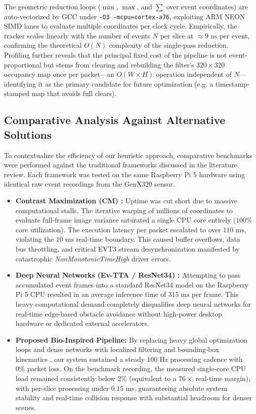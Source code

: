 \documentclass[conference]{IEEEtran}
\begin{document}
The geometric reduction loops ($\min$, $\max$, and $\sum$ over event coordinates) are auto-vectorized by GCC under \texttt{-O3 -mcpu=cortex-a76}, exploiting ARM NEON SIMD lanes to evaluate multiple coordinates per clock cycle. Empirically, the tracker scales linearly with the number of events $N$ per slice at $\approx 9\text{ ns}$ per event, confirming the theoretical $O(N)$ complexity of the single-pass reduction. Profiling further reveals that the principal fixed cost of the pipeline is not event-proportional but stems from clearing and rebuilding the filter's $320 \times 320$ occupancy map once per packet---an $O(W \times H)$ operation independent of $N$---identifying it as the primary candidate for future optimization (e.g. a timestamp-stamped map that avoids full clears).

\subsection{Comparative Analysis Against Alternative Solutions}
To contextualize the efficiency of our heuristic approach, comparative benchmarks were performed against the traditional frameworks discussed in the literature review. Each framework was tested on the same Raspberry Pi 5 hardware using identical raw event recordings from the GenX320 sensor.

\begin{itemize}
    \item \textbf{Contrast Maximization (CM) \cite{b6}:} Uptime was cut short due to massive computational stalls. The iterative warping of millions of coordinates to evaluate full-frame image variance saturated a single CPU core entirely ($100\%$ core utilization). The execution latency per packet escalated to over $110\text{ ms}$, violating the $10\text{ ms}$ real-time boundary. This caused buffer overflows, data bus throttling, and critical EVT3 stream desynchronization manifested by catastrophic \textit{NonMonotonicTimeHigh} driver errors.
    \item \textbf{Deep Neural Networks (Ev-TTA / ResNet34) \cite{b11}:} Attempting to pass accumulated event frames into a standard ResNet34 model on the Raspberry Pi 5 CPU resulted in an average inference time of $315\text{ ms}$ per frame. This heavy computational demand completely disqualifies deep neural networks for real-time edge-based obstacle avoidance without high-power desktop hardware or dedicated external accelerators.
    \item \textbf{Proposed Bio-Inspired Pipeline:} By replacing heavy global optimization loops and dense networks with localized filtering and bounding-box kinematics \cite{b13}, our system sustained a steady $100\text{ Hz}$ processing cadence with $0\%$ packet loss. On the benchmark recording, the measured single-core CPU load remained consistently below $2\%$ (equivalent to a $76\times$ real-time margin), with per-slice processing under $0.15\text{ ms}$, guaranteeing absolute system stability and real-time collision response with substantial headroom for denser scenes.
\end{itemize}
\end{document}
